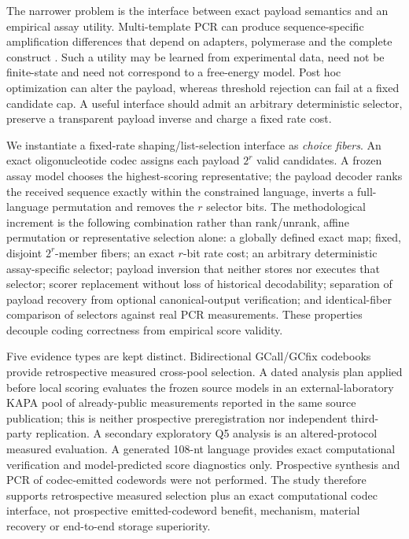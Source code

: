 \documentclass[10pt]{article}
\begin{document}
The narrower problem is the interface between exact payload semantics and an empirical assay utility. Multi-template PCR can produce sequence-specific amplification differences that depend on adapters, polymerase and the complete construct \cite{gimpel2025pcrbias}. Such a utility may be learned from experimental data, need not be finite-state and need not correspond to a free-energy model. Post hoc optimization can alter the payload, whereas threshold rejection can fail at a fixed candidate cap. A useful interface should admit an arbitrary deterministic selector, preserve a transparent payload inverse and charge a fixed rate cost.

We instantiate a fixed-rate shaping/list-selection interface as \emph{choice fibers}. An exact oligonucleotide codec assigns each payload $2^r$ valid candidates. A frozen assay model chooses the highest-scoring representative; the payload decoder ranks the received sequence exactly within the constrained language, inverts a full-language permutation and removes the $r$ selector bits. The methodological increment is the following combination rather than rank/unrank, affine permutation or representative selection alone: a globally defined exact map; fixed, disjoint $2^r$-member fibers; an exact $r$-bit rate cost; an arbitrary deterministic assay-specific selector; payload inversion that neither stores nor executes that selector; scorer replacement without loss of historical decodability; separation of payload recovery from optional canonical-output verification; and identical-fiber comparison of selectors against real PCR measurements. These properties decouple coding correctness from empirical score validity.

Five evidence types are kept distinct. Bidirectional GCall/GCfix codebooks provide retrospective measured cross-pool selection. A dated analysis plan applied before local scoring evaluates the frozen source models in an external-laboratory KAPA pool of already-public measurements reported in the same source publication; this is neither prospective preregistration nor independent third-party replication. A secondary exploratory Q5 analysis is an altered-protocol measured evaluation. A generated 108-nt language provides exact computational verification and model-predicted score diagnostics only. Prospective synthesis and PCR of codec-emitted codewords were not performed. The study therefore supports retrospective measured selection plus an exact computational codec interface, not prospective emitted-codeword benefit, mechanism, material recovery or end-to-end storage superiority.
\end{document}

